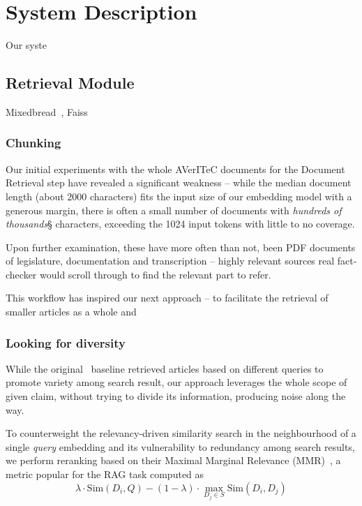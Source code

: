 
\section{System Description}
\label{sec:system}
Our syste

\subsection{Retrieval Module}
Mixedbread~\cite{li-li-2024-aoe,emb2024mxbai}, Faiss~\cite{douze2024faiss,johnson2019billion}

\subsubsection{Chunking}
Our initial experiments with the whole AVerITeC documents for the Document Retrieval step have revealed a significant weakness -- while the median document length (about 2000 characters) fits the input size of our embedding model with a generous margin, there is often a small number of documents with \textit{hundreds of thousands}§ characters, exceeding the 1024 input tokens with little to no coverage.

Upon further examination, these have more often than not, been PDF documents of legislature, documentation and transcription -- highly relevant sources real fact-checker would scroll through to find the relevant part to refer. 

This workflow has inspired our next approach -- to facilitate the retrieval of smaller articles as a whole and 

\subsubsection{Looking for diversity}
While the original~\cite{averitec2024} baseline retrieved articles based on different queries to promote variety among search result, our approach leverages the whole scope of given claim, without trying to divide its information, producing noise along the way.

To counterweight the relevancy-driven similarity search in the neighbourhood of a single \textit{query} embedding and its vulnerability to redundancy among search results, we perform reranking based on their Maximal Marginal Relevance (MMR)~\cite{carbonell-mmr}, a metric popular for the RAG task computed as
$$\lambda \cdot \mathrm{Sim}(D_i, Q) - (1-\lambda) \cdot \max_{D_j \in S} \mathrm{Sim}(D_i, D_j)$$

